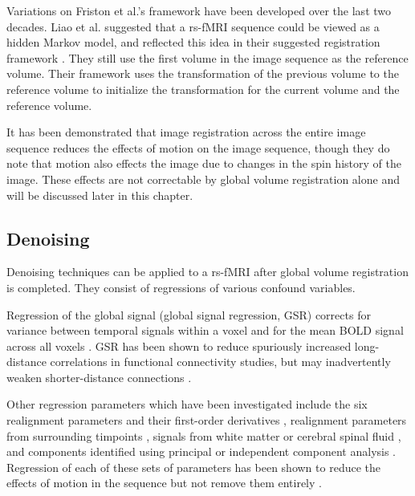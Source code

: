 Variations on Friston et al.'s framework have been developed over the last two decades. Liao et al. suggested that a rs-fMRI sequence could be viewed as a hidden Markov model, and reflected this idea in their suggested registration framework \cite{Liao2016}. They still use the first volume in the image sequence as the reference volume. Their framework uses the transformation of the previous volume to the reference volume to initialize the transformation for the current volume and the reference volume. 

It has been demonstrated that image registration across the entire image sequence reduces the effects of motion on the image sequence, though they do note that motion also effects the image due to changes in the spin history of the image. These effects are not correctable by global volume registration alone and will be discussed later in this chapter.

\subsection{Denoising}

Denoising techniques can be applied to a rs-fMRI after global volume registration is completed. They consist of regressions of various confound variables. 

Regression of the global signal (global signal regression, GSR) corrects for variance between temporal signals within a voxel and for the mean BOLD signal across all voxels \cite{Power2014} \cite{Satterthwaite2013} \cite{Yan2013} \cite{Yan2013a}. GSR has been shown to reduce spuriously increased long-distance correlations in functional connectivity studies, but may inadvertently weaken shorter-distance connections \cite{Jo2013} \cite{Power2014}  \cite{Satterthwaite2012}. 

Other regression parameters which have been investigated include the six realignment parameters and their first-order derivatives \cite{Power2012} \cite{Satterthwaite2012} \cite{VanDijk2012}, realignment parameters from surrounding timpoints \cite{Patriat2017} \cite{Power2014} \cite{Satterthwaite2013} \cite{Yan2013a}, signals from white matter or cerebral spinal fluid \cite{Power2014} \cite{Satterthwaite2013} \cite{Yan2013a} \cite{Jo2010}, and components identified using principal or independent component analysis \cite{Pruim2015} \cite{Salimi-Khorshidi2014} \cite{Behzadi2007}. Regression of each of these sets of parameters has been shown to reduce the effects of motion in the sequence but not remove them entirely \cite{Power2015} \cite{Parkes2017}. 


